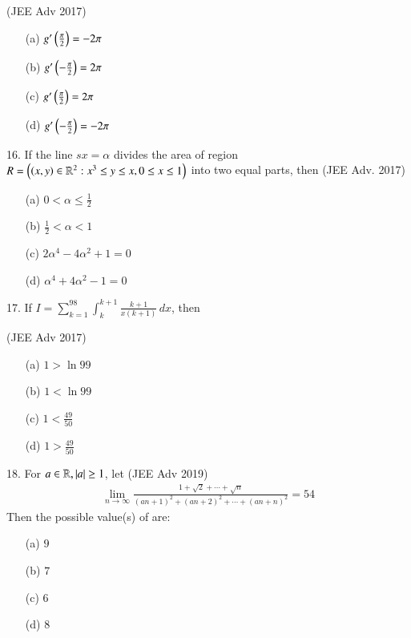 \documentclass[journal,12pt,twocolumn]{IEEEtran}
\theoremstyle{remark}
\begin{document}
\hfill (JEE Adv 2017)
\begin{multicols}{2}
\begin{enumerate}
\item [(a)] $g'\left(\frac{\pi}{2}\right) = -2\pi$
\item [(b)] $g' \left(-\frac{\pi}{2}\right) = 2\pi$
\columnbreak
\item[(c)] $g' \left(\frac{\pi}{2}\right) = 2\pi$
\item[(d)] $g' \left(-\frac{\pi}{2}\right) = -2\pi$
\end{enumerate}
\end{multicols}
16. If the line $sx = \alpha$ divides the area of region
$R = \left(\left(x, y\right) \in \mathbb{R}^2 : x^3 \leq y \leq x, 0 \leq x \leq 1\right)$
into two equal parts, then \hfill (JEE Adv. 2017)
\begin{multicols}{2}
\begin{enumerate}
\item[(a)] $0 < \alpha \leq \frac{1}{2}$
\item[(b)] $\frac{1}{2} < \alpha < 1$
\columnbreak
\item[(c)] $2\alpha^4 - 4\alpha^2 + 1 = 0$
\item[(d)] $\alpha^4 + 4\alpha^2 - 1 = 0$
\end{enumerate}
\end{multicols}
17. If $I = \sum_{k=1}^{98} \int_{k}^{k+1} \frac{k+1}{x(k+1)} \, dx$, then

\hfill (JEE Adv 2017)
\begin{multicols}{2}
\begin{enumerate}
\item[(a)] $1 > \ln 99$
\item[(b)] $1 < \ln 99$
\columnbreak
\item[(c)] $1 < \frac{49}{50}$  
\item [(d)] $1 > \frac{49}{50}$
\end{enumerate}
\end{multicols}
18. For $a \in \mathbb{R}, \left\vert a\right\vert \geq 1$, let \hfill (JEE Adv 2019)
\begin{align*}
\lim_{{n \to \infty}} \frac{1 + \sqrt{2} + \cdots + \sqrt{n}}{(an+1)^2 + (an+2)^2 + \cdots + (an+n)^2} = 54
\end{align*}
Then the possible value(s) of  are:
\begin{multicols}{2}
\begin{enumerate}
\item[(a)] $9$
\item[(b)] $7$
\columnbreak
\item[(c)] $6$
\item[(d)] $8$
\end{enumerate}
\end{multicols}
\end{document}
